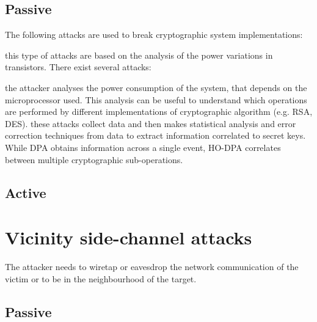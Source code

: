 \subsection{Passive}
The following attacks are used to break cryptographic system implementations:
\begin{itemize}
{this type of attacks are based on the analysis of the power variations in transistors. There exist several attacks\cite{intro_DPA}:
\begin{itemize}
{the attacker analyses the power consumption of the system, that depends on the microprocessor used. This analysis can be useful to understand which operations are performed by different implementations of cryptographic algorithm (e.g. RSA, DES).}
{these attacks collect data and then makes statistical analysis and error correction techniques from data to extract information correlated to secret keys.}
{While DPA obtains information across a single event, HO-DPA correlates between multiple cryptographic sub-operations.}
\end{itemize}}
{}
{}
{}
\end{itemize}

\subsection{Active}
\begin{itemize}
{}
{}
{}
{}
{}
{}
\end{itemize}


\section{Vicinity side-channel attacks}
The attacker needs to wiretap or eavesdrop the network communication of the victim or to be in the neighbourhood of the target.
\subsection{Passive}
\begin{itemize}
{}
{}
{}
\end{itemize}

